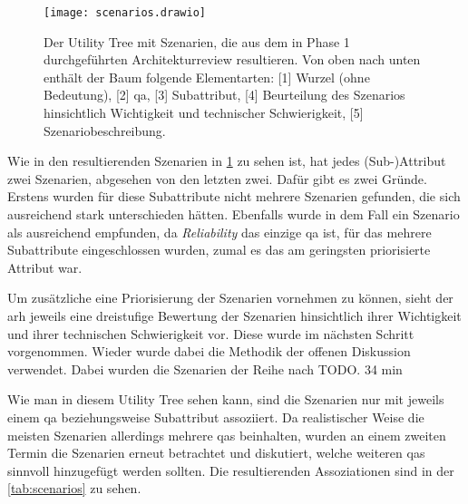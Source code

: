 
\begin{figure}
	\centering
	\texttt{[image: scenarios.drawio]}
	\caption[Utility Tree mit im Architekturreview ermittelten Qualitätsanforderungen und Szenarien]{
		Der Utility Tree mit Szenarien, die aus dem in Phase 1 durchgeführten Architekturreview resultieren.
		Von oben nach unten enthält der Baum folgende Elementarten: [1] Wurzel (ohne Bedeutung), [2] \gls{qa}, [3] Subattribut, [4] Beurteilung des Szenarios hinsichtlich Wichtigkeit und technischer Schwierigkeit, [5] Szenariobeschreibung.
	}
	\label{fig:scenarios}
\end{figure}

Wie in den resultierenden Szenarien in \cref{fig:scenarios} zu sehen ist, hat jedes (Sub-)Attribut zwei Szenarien, abgesehen von den letzten zwei.
Dafür gibt es zwei Gründe.
Erstens wurden für diese Subattribute nicht mehrere Szenarien gefunden, die sich ausreichend stark unterschieden hätten.
Ebenfalls wurde in dem Fall ein Szenario als ausreichend empfunden, da \emph{Reliability} das einzige \gls{qa} ist, für das mehrere Subattribute eingeschlossen wurden, zumal es das am geringsten priorisierte Attribut war.

Um zusätzliche eine Priorisierung der Szenarien vornehmen zu können, sieht der \gls{arh} jeweils eine dreistufige Bewertung der Szenarien hinsichtlich ihrer Wichtigkeit und ihrer technischen Schwierigkeit vor.
Diese wurde im nächsten Schritt vorgenommen.
Wieder wurde dabei die Methodik der offenen Diskussion verwendet.
Dabei wurden die Szenarien der Reihe nach TODO.
34 min




Wie man in diesem Utility Tree sehen kann, sind die Szenarien nur mit jeweils einem \gls{qa} beziehungsweise Subattribut assoziiert.
Da realistischer Weise die meisten Szenarien allerdings mehrere \glspl{qa} beinhalten, wurden an einem zweiten Termin die Szenarien erneut betrachtet und diskutiert, welche weiteren \glspl{qa} sinnvoll hinzugefügt werden sollten.
Die resultierenden Assoziationen sind in der \cref{tab:scenarios} zu sehen.

